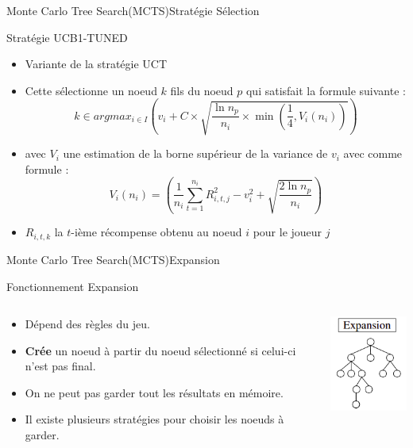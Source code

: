 \begin{frame}{Monte Carlo Tree Search(MCTS)}{Stratégie Sélection}
	\begin{block}{Stratégie UCB1-TUNED}
		\begin{itemize}
			\item Variante de la stratégie UCT
			\item Cette sélectionne un noeud $k$ fils du noeud $p$ qui satisfait la formule suivante :
			      $$k \in argmax_{i\in I}(v_{i} + C \times \sqrt{\frac{\ln n_{p}}{n_{i}}\times \min(\frac{1}{4}, V_{i}(n_{i}))})$$
			\item avec $V_{i}$ une estimation de la borne supérieur de la variance de $v_{i}$ avec comme formule :
			      $$V_{i}(n_{i}) = (\frac{1}{n_{i}}\sum_{t=1}^{n_{i}}R_{i,t,j}^2 - v_{i}^2 + \sqrt{\frac{2\ln n_{p}}{n_{i}}})$$
			\item $R_{i,t,k}$ la $t$-ième récompense obtenu au noeud $i$ pour le joueur $j$
		\end{itemize}
	\end{block}
\end{frame}

\begin{frame}{Monte Carlo Tree Search(MCTS)}{Expansion}
	\begin{block}{Fonctionnement Expansion}
		\begin{columns}
			\begin{column}{8cm}
				\begin{itemize}
					\item Dépend des règles du jeu.
					\item \textbf{Crée} un noeud à partir du noeud sélectionné si celui-ci n'est pas final.
					\item On ne peut pas garder tout les résultats en mémoire.
					\item Il existe plusieurs stratégies pour choisir les noeuds à garder.
				\end{itemize}
			\end{column}
			\begin{column}{4cm}
				\includegraphics[width=3cm]{ressources/MCTS/Expansion.png}
			\end{column}
		\end{columns}
	\end{block}
\end{frame}

